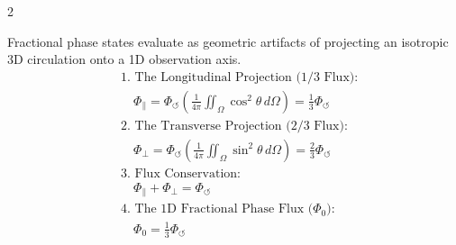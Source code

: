\begin{multicols}{2}
\begin{tcolorbox}[cheatbox, title={\refstepcounter{cheatnum}\label{box:tensor_projections}\thecheatnum. 1D Fractional Flux \hfill\makebox[0pt][r]{\scriptsize\hyperref[sec:deriv_tensor_projections]{[Proof $\downarrow$]}}}]
Fractional phase states evaluate as geometric artifacts of projecting an isotropic 3D circulation onto a 1D observation axis.
\begin{align}
    &\text{1. The Longitudinal Projection (1/3 Flux):} \nonumber \\
    &\quad \Phi_{\parallel} = \Phi_{\circlearrowleft} \left( \frac{1}{4\pi} \iint_{\Omega} \cos^2 \theta \, d\Omega \right) = \frac{1}{3} \Phi_{\circlearrowleft} \label{eq:tensor_long} \\
    &\text{2. The Transverse Projection (2/3 Flux):} \nonumber \\
    &\quad \Phi_{\perp} = \Phi_{\circlearrowleft} \left( \frac{1}{4\pi} \iint_{\Omega} \sin^2 \theta \, d\Omega \right) = \frac{2}{3} \Phi_{\circlearrowleft} \label{eq:tensor_trans} \\
    &\text{3. Flux Conservation:} \nonumber \\
    &\quad \Phi_{\parallel} + \Phi_{\perp} = \Phi_{\circlearrowleft} \label{eq:projection_conservation} \\
    &\text{4. The 1D Fractional Phase Flux ($\Phi_0$):} \nonumber \\
    &\quad \Phi_0 = \frac{1}{3}\Phi_{\circlearrowleft} \label{eq:1d_phase_flux}
\end{align}
\end{tcolorbox}


\end{multicols}
